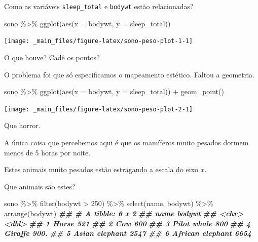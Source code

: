 \documentclass[
  11pt]{report}
\newenvironment{Shaded}{\begin{snugshade}}{\end{snugshade}}
\newcommand{\AttributeTok}[1]{\textcolor[rgb]{0.77,0.63,0.00}{#1}}
\newcommand{\DecValTok}[1]{\textcolor[rgb]{0.00,0.00,0.81}{#1}}
\newcommand{\DocumentationTok}[1]{\textcolor[rgb]{0.56,0.35,0.01}{\textbf{\textit{#1}}}}
\newcommand{\FunctionTok}[1]{\textcolor[rgb]{0.00,0.00,0.00}{#1}}
\newcommand{\NormalTok}[1]{#1}
\newcommand{\SpecialCharTok}[1]{\textcolor[rgb]{0.00,0.00,0.00}{#1}}
\begin{document}
Como as variáveis \texttt{sleep\_total} e \texttt{bodywt} estão relacionadas?

\begin{Shaded}
\begin{Highlighting}[]
\NormalTok{sono }\SpecialCharTok{\%\textgreater{}\%} 
  \FunctionTok{ggplot}\NormalTok{(}\FunctionTok{aes}\NormalTok{(}\AttributeTok{x =}\NormalTok{ bodywt, }\AttributeTok{y =}\NormalTok{ sleep\_total))}
\end{Highlighting}
\end{Shaded}

\begin{center}\texttt{[image: \_main\_files/figure-latex/sono-peso-plot-1-1]} \end{center}

O que houve? Cadê os pontos?

O problema foi que só especificamos o mapeamento estético. Faltou a geometria.

\begin{Shaded}
\begin{Highlighting}[]
\NormalTok{sono }\SpecialCharTok{\%\textgreater{}\%} 
  \FunctionTok{ggplot}\NormalTok{(}\FunctionTok{aes}\NormalTok{(}\AttributeTok{x =}\NormalTok{ bodywt, }\AttributeTok{y =}\NormalTok{ sleep\_total)) }\SpecialCharTok{+}
  \FunctionTok{geom\_point}\NormalTok{()}
\end{Highlighting}
\end{Shaded}

\begin{center}\texttt{[image: \_main\_files/figure-latex/sono-peso-plot-2-1]} \end{center}

Que horror.

A única coisa que percebemos aqui é que os mamíferos muito pesados dormem menos de 5 horas por noite.

Estes animais muito pesados estão estragando a escala do eixo \(x\).

Que animais são estes?

\begin{Shaded}
\begin{Highlighting}[]
\NormalTok{sono }\SpecialCharTok{\%\textgreater{}\%} 
  \FunctionTok{filter}\NormalTok{(bodywt }\SpecialCharTok{\textgreater{}} \DecValTok{250}\NormalTok{) }\SpecialCharTok{\%\textgreater{}\%} 
  \FunctionTok{select}\NormalTok{(name, bodywt) }\SpecialCharTok{\%\textgreater{}\%} 
  \FunctionTok{arrange}\NormalTok{(bodywt)}
\DocumentationTok{\#\# \# A tibble: 6 x 2}
\DocumentationTok{\#\#   name             bodywt}
\DocumentationTok{\#\#   \textless{}chr\textgreater{}             \textless{}dbl\textgreater{}}
\DocumentationTok{\#\# 1 Horse              521 }
\DocumentationTok{\#\# 2 Cow                600 }
\DocumentationTok{\#\# 3 Pilot whale        800 }
\DocumentationTok{\#\# 4 Giraffe            900.}
\DocumentationTok{\#\# 5 Asian elephant    2547 }
\DocumentationTok{\#\# 6 African elephant  6654}
\end{Highlighting}
\end{Shaded}
\end{document}
